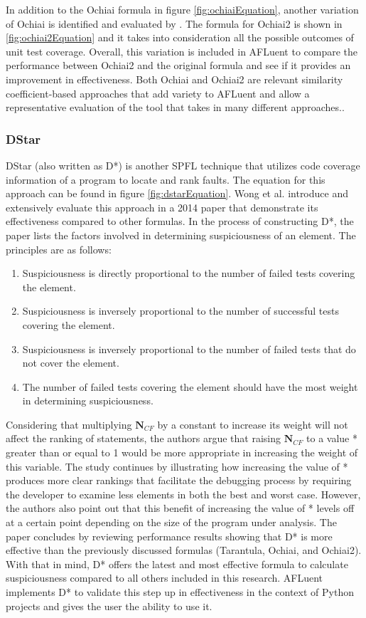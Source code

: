 In addition to the Ochiai formula in figure \ref{fig:ochiaiEquation}, another
variation of Ochiai is identified and evaluated by \cite{naish2011model}. The
formula for Ochiai2 is shown in \ref{fig:ochiai2Equation} and it takes into
consideration all the possible outcomes of unit test coverage. Overall, this
variation is included in AFLuent to compare the performance between Ochiai2 and
the original formula and see if it provides an improvement in effectiveness.
Both Ochiai and Ochiai2 are relevant similarity coefficient-based approaches
that add variety to AFLuent and allow a representative evaluation of the tool
that takes in many different approaches..

\subsubsection{DStar}
\label{subsubsec:dstar_lit}

DStar (also written as D*) is another SPFL technique that utilizes code coverage
information of a program to locate and rank faults. The equation for this
approach can be found in figure \ref{fig:dstarEquation}. Wong et al.
\cite{Wong2014DStar} introduce and extensively evaluate this approach in a 2014
paper that demonstrate its effectiveness compared to other formulas. In the
process of constructing D*, the paper lists the factors involved in determining
suspiciousness of an element. The principles are as follows:
\begin{enumerate}
	\item Suspiciousness is directly proportional to the number of failed tests
	covering the element.
	\item Suspiciousness is inversely proportional to the number of successful tests
	covering the element.
	\item Suspiciousness is inversely proportional to the number of failed tests
	that do not cover the element.
	\item The number of failed tests covering the element should have the most
	weight in determining suspiciousness.
\end{enumerate}

Considering that multiplying \(\textbf{N$_{CF}$}\) by a constant to increase its
weight will not affect the ranking of statements, the authors argue that
raising \(\textbf{N$_{CF}$}\) to a value * greater than
or equal to 1 would be more appropriate in increasing the weight of this
variable. The study continues by illustrating how increasing the value of *
produces more clear rankings that facilitate the debugging process by requiring
the developer to examine less elements in both the best and worst case. However,
the authors also point out that this benefit of increasing the value of * levels
off at a certain point depending on the size of the program under analysis.
The paper concludes by reviewing performance results showing that D* is more
effective than the previously discussed formulas (Tarantula, Ochiai, and
Ochiai2). With that in mind, D* offers the latest and most effective formula to
calculate suspiciousness compared to all others included in this research.
AFLuent implements D* to validate this step up in effectiveness in the context of
Python projects and gives the user the ability to use it.

